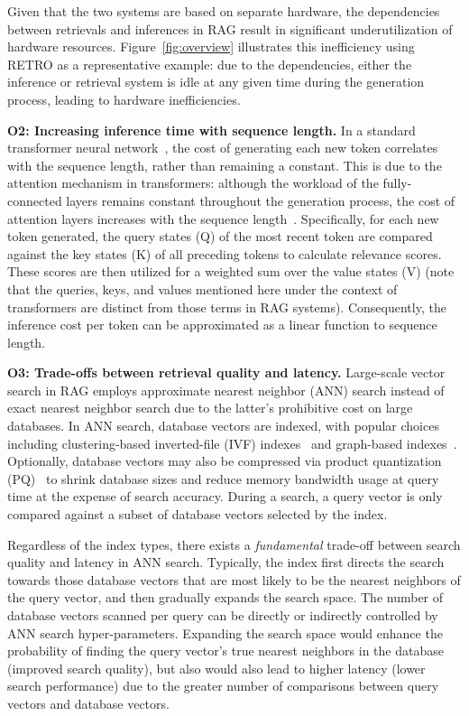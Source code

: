 Given that the two systems are based on separate hardware, the dependencies between retrievals and inferences in RAG result in significant underutilization of hardware resources. Figure~\ref{fig:overview} illustrates this inefficiency using RETRO as a representative example: due to the dependencies, either the inference or retrieval system is idle at any given time during the generation process, leading to hardware inefficiencies. 

\textbf{O2: Increasing inference time with sequence length.} 
In a standard transformer neural network~\cite{vaswani2017attention}, the cost of generating each new token correlates with the sequence length, rather than remaining a constant. This is due to the attention mechanism in transformers: although the workload of the fully-connected layers remains constant throughout the generation process, the cost of attention layers increases with the sequence length~\cite{beltagy2020longformer}. Specifically, for each new token generated, the query states (Q) of the most recent token are compared against the key states (K) of all preceding tokens to calculate relevance scores. These scores are then utilized for a weighted sum over the value states (V) (note that the queries, keys, and values mentioned here under the context of transformers are distinct from those terms in RAG systems).
Consequently, the inference cost per token can be approximated as a linear function to sequence length.

\textbf{O3: Trade-offs between retrieval quality and latency.} Large-scale vector search in RAG employs approximate nearest neighbor (ANN) search instead of exact nearest neighbor search due to the latter's prohibitive cost on large databases. In ANN search, database vectors are indexed, with popular choices including clustering-based inverted-file (IVF) indexes~\cite{IVF} and graph-based indexes~\cite{malkov2014approximate, malkov2018efficient}. Optionally, database vectors may also be compressed via product quantization (PQ)~\cite{PQ} to shrink database sizes and reduce memory bandwidth usage at query time at the expense of search accuracy. During a search, a query vector is only compared against a subset of database vectors selected by the index. 

Regardless of the index types, there exists a \textit{fundamental} trade-off between search quality and latency in ANN search. Typically, the index first directs the search towards those database vectors that are most likely to be the nearest neighbors of the query vector, and then gradually expands the search space. The number of database vectors scanned per query can be directly or indirectly controlled by ANN search hyper-parameters. Expanding the search space would enhance the probability of finding the query vector's true nearest neighbors in the database (improved search quality), but also would also lead to higher latency (lower search performance) due to the greater number of comparisons between query vectors and database vectors.

